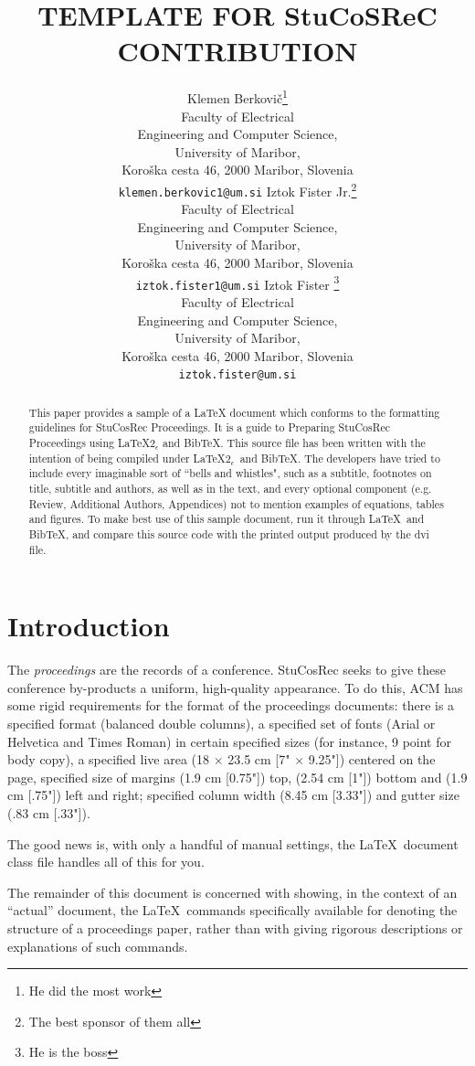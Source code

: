 \documentclass[article]{stucosrec}
\title{\latex TEMPLATE FOR StuCoSReC CONTRIBUTION}
\author{
	Klemen Berkovi\v{c}\thanks{He did the most work} \\
	Faculty of Electrical \\Engineering and Computer Science,\\
	University of Maribor,\\
	Koro\v{s}ka cesta 46, 2000 Maribor, Slovenia \\
	\texttt{klemen.berkovic1@um.si}
	\And
	Iztok Fister Jr.\thanks{The best sponsor of them all} \\
	Faculty of Electrical \\Engineering and Computer Science,\\
	University of Maribor,\\
	Koro\v{s}ka cesta 46, 2000 Maribor, Slovenia \\
	\texttt{iztok.fister1@um.si}
	\AND
	Iztok Fister \thanks{He is the boss} \\
	Faculty of Electrical \\Engineering and Computer Science,\\
	University of Maribor,\\
	Koro\v{s}ka cesta 46, 2000 Maribor, Slovenia \\
	\texttt{iztok.fister@um.si}
}
\newcommand{\latex}{\LaTeX\xspace}
\begin{document}
	
	\maketitle
	
	\begin{abstract}
		This paper provides a sample of a \latex document which
conforms to the formatting guidelines for StuCosRec Proceedings.
		It is a guide to Preparing StuCosRec Proceedings using \LaTeX$2_\epsilon$ and Bib\TeX.
		This
source file has been written with the intention of being
compiled under \LaTeX$2_\epsilon$\ and BibTeX.		
		The developers have tried to include every imaginable sort
of ``bells and whistles", such as a subtitle, footnotes on
title, subtitle and authors, as well as in the text, and every optional component (e.g. Review, Additional
Authors, Appendices) not to mention examples of
equations, tables and figures.
		To make best use of this sample document, run it through \LaTeX\
and Bib\TeX, and compare this source code with the printed
output produced by the dvi file.
	\end{abstract}

		
	\section{Introduction}
	
	The \textit{proceedings} are the records of a conference.
	StuCosRec seeks to give these conference by-products a uniform,
high-quality appearance. 
	To do this, ACM has some rigid
requirements for the format of the proceedings documents: there
is a specified format (balanced  double columns), a specified
set of fonts (Arial or Helvetica and Times Roman) in
certain specified sizes (for instance, 9 point for body copy),
a specified live area (18 $\times$ 23.5 cm [7" $\times$ 9.25"]) centered on
the page, specified size of margins (1.9 cm [0.75"]) top, (2.54 cm [1"]) bottom
and (1.9 cm [.75"]) left and right; specified column width
(8.45 cm [3.33"]) and gutter size (.83 cm [.33"]).
	
	The good news is, with only a handful of manual
settings, the \LaTeX\ document
class file handles all of this for you.
	
	The remainder of this document is concerned with showing, in
the context of an ``actual'' document, the \LaTeX\ commands
specifically available for denoting the structure of a
proceedings paper, rather than with giving rigorous descriptions
or explanations of such commands.
	
\end{document}
